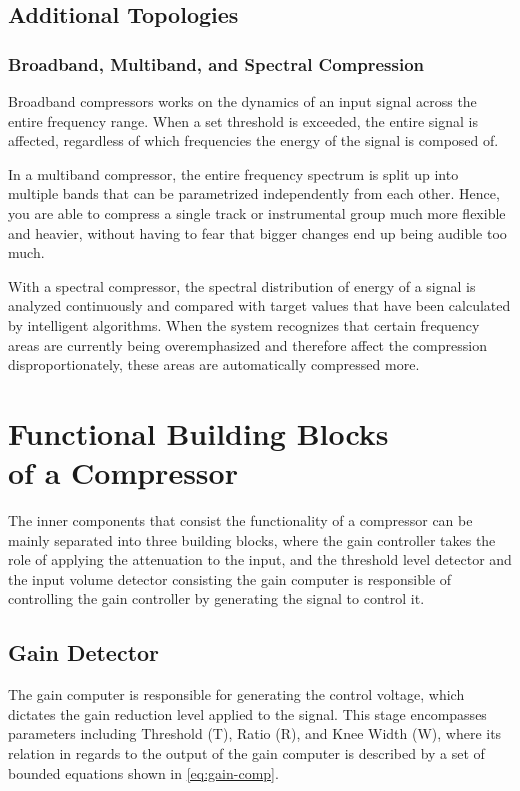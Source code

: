 \documentclass[10pt]{article}
\begin{document}
\begin{multicols*}{2}
\begin{minipage}{\linewidth}
                    \end{minipage}

            \subsection{Additional Topologies}

                \subsubsection{Broadband, Multiband, and Spectral Compression}
                    Broadband compressors works on the dynamics of an input signal across the entire frequency range. When a set threshold is exceeded, the entire signal is affected, regardless of which frequencies the energy of the signal is composed of.\par
                    In a multiband compressor, the entire frequency spectrum is split up into multiple bands that can be parametrized independently from each other. Hence, you are able to compress a single track or instrumental group much more flexible and heavier, without having to fear that bigger changes end up being audible too much.\par
                    With a spectral compressor, the spectral distribution of energy of a signal is analyzed continuously and compared with target values that have been calculated by intelligent algorithms. When the system recognizes that certain frequency areas are currently being overemphasized and therefore affect the compression disproportionately, these areas are automatically compressed more.

        \section[Functional Building Blocks of a Compressor]{Functional Building Blocks\\of a Compressor}
            The inner components that consist the functionality of a compressor can be mainly separated into three building blocks, where the gain controller takes the role of applying the attenuation to the input, and the threshold level detector and the input volume detector consisting the gain computer is responsible of controlling the gain controller by generating the signal to control it.

            \subsection{Gain Detector}
                The gain computer is responsible for generating the control voltage, which dictates the gain reduction level applied to the signal. This stage encompasses parameters including Threshold (T), Ratio (R), and Knee Width (W), where its relation in regards to the output of the gain computer is described by a set of bounded equations shown in \ref{eq:gain-comp}.


\end{multicols*}
\end{document}
